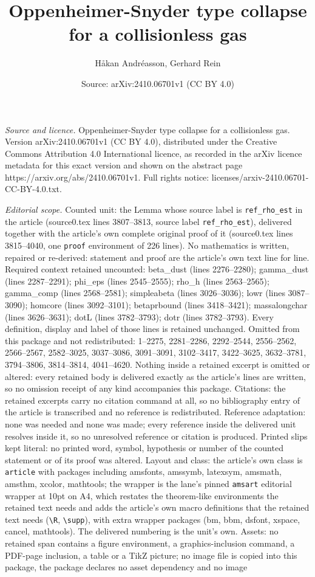 \documentclass[10pt,a4paper]{amsart}
\title[Oppenheimer-Snyder type collapse for a collisionless gas]{Oppenheimer-Snyder type collapse for a collisionless gas}
\author{H{\aa}kan Andr\'easson, Gerhard Rein}
\date{Source: arXiv:2410.06701v1 (CC BY 4.0)}
\begin{document}
\maketitle

\noindent\emph{Source and licence.} Oppenheimer-Snyder type collapse for a collisionless gas. Version arXiv:2410.06701v1 (CC BY 4.0), distributed under the Creative Commons Attribution 4.0 International licence, as recorded in the arXiv licence metadata for this exact version and shown on the abstract page https://arxiv.org/abs/2410.06701v1. Full rights notice: licenses/arxiv-2410.06701-CC-BY-4.0.txt.\par\smallskip

\noindent\textit{Editorial scope.} Counted unit: the Lemma whose source label is \texttt{ref\_rho\_est} in the article (source0.tex lines 3807--3813, source label \texttt{ref\_rho\_est}), delivered together with the article's own complete original proof of it (source0.tex lines 3815--4040, one \texttt{proof} environment of 226 lines). No mathematics is written, repaired or re-derived: statement and proof are the article's own text line for line. Required context retained uncounted: beta\_dust (lines 2276--2280); gamma\_dust (lines 2287--2291); phi\_eps (lines 2545--2555); rho\_h (lines 2563--2565); gamma\_comp (lines 2568--2581); simpleabeta (lines 3026--3036); lowr (lines 3087--3090); homcore (lines 3092--3101); betaprbound (lines 3418--3421); massalongchar (lines 3626--3631); dotL (lines 3782--3793); dotr (lines 3782--3793). Every definition, display and label of those lines is retained unchanged. Omitted from this package and not redistributed: 1--2275, 2281--2286, 2292--2544, 2556--2562, 2566--2567, 2582--3025, 3037--3086, 3091--3091, 3102--3417, 3422--3625, 3632--3781, 3794--3806, 3814--3814, 4041--4620. Nothing inside a retained excerpt is omitted or altered: every retained body is delivered exactly as the article's lines are written, so no omission receipt of any kind accompanies this package. Citations: the retained excerpts carry no citation command at all, so no bibliography entry of the article is transcribed and no reference is redistributed. Reference adaptation: none was needed and none was made; every reference inside the delivered unit resolves inside it, so no unresolved reference or citation is produced. Printed slips kept literal: no printed word, symbol, hypothesis or number of the counted statement or of its proof was altered. Layout and class: the article's own class is \texttt{article} with packages including amsfonts, amssymb, latexsym, amsmath, amsthm, xcolor, mathtools; the wrapper is the lane's pinned \texttt{amsart} editorial wrapper at 10pt on A4, which restates the theorem-like environments the retained text needs and adds the article's own macro definitions that the retained text needs (\texttt{\textbackslash R}, \texttt{\textbackslash supp}), with extra wrapper packages (bm, bbm, dsfont, xspace, cancel, mathtools). The delivered numbering is the unit's own. Assets: no retained span contains a figure environment, a graphics-inclusion command, a PDF-page inclusion, a table or a TikZ picture; no image file is copied into this package, the package declares no asset dependency and no image 
\end{document}
